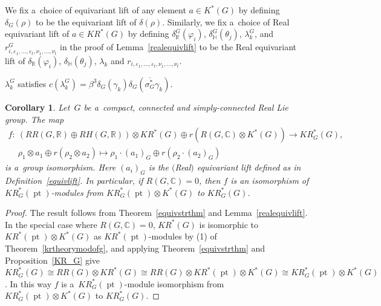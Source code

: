 \documentclass[pdftex]{sigma}
\numberwithin{equation}{section}
\newtheorem{Corollary}[Theorem]{Corollary}
\DeclareMathOperator{\pt}{pt}
\begin{document}
\begin{Definition}
\label{equivlift}
We f\/ix a~choice of equivariant lift of any element $a\in K^*(G)$ by def\/ining $\delta_G(\rho)$ to be the equivariant lift
of $\delta(\rho)$.
Similarly, we f\/ix a~choice of Real equivariant lift of $a\in KR^*(G)$ by def\/ining $\delta_\mathbb{R}^G(\varphi_i)$,
$\delta_\mathbb{H}^G(\theta_j)$, $\lambda_k^G$, and $r^G_{i, \varepsilon_1, \dots, \varepsilon_t, \nu_1, \dots, \nu_t}$
in the proof of Lemma~\ref{realequivlift} to be the Real equivariant lift of $\delta_\mathbb{R}(\varphi_i)$,
$\delta_\mathbb{H}(\theta_j)$, $\lambda_k$ and $r_{i, \varepsilon_1, \dots, \varepsilon_t, \nu_1, \dots, \nu_t}$.
\end{Definition}
\begin{Remark}
\label{cplxeqsquare}
$\lambda^G_k$ satisf\/ies $c(\lambda^G_k)=\beta^3\delta_G(\gamma_k)\delta_G(\overline{\sigma_G^*}
\gamma_k)$.
\end{Remark}
\begin{Corollary}
\label{equivstrthmg}
Let~$G$ be a~compact, connected and simply-connected Real Lie group.
The map
\begin{gather*}
f: \ (RR(G, \mathbb{R})\oplus RH(G, \mathbb{R}))\otimes KR^*(G)\oplus r(R(G, \mathbb{C})\otimes K^*(G))  \to  KR_G^*(G),
\\
\phantom{f: {}} \
\rho_1\otimes a_1\oplus r(\rho_2\otimes a_2)  \mapsto  \rho_1\cdot (a_1)_{G}\oplus r(\rho_2\cdot (a_2)_G)
\end{gather*}
is a~group isomorphism.
Here $(a_i)_G$ is the $($Real$)$ equivariant lift defined as in Definition~{\rm \ref{equivlift}}.
In particular, if $R(G, \mathbb{C})=0$, then $f$ is an isomorphism of $KR^*_{G}(\pt)$-modules from
$KR_G^*(\pt)\otimes K^*(G)$ to $KR_G^*(G)$.
\end{Corollary}
\begin{proof}
The result follows from Theorem~\ref{equivstrthm} and Lemma~\ref{realequivlift}.
In the special case where $R(G, \mathbb{C})=0$, $KR^*(G)$ is isomorphic to $KR^*(\pt)\otimes K^*(G)$ as
$KR^*(\pt)$-modules by (1) of Theorem~\ref{krtheorymodofg}, and applying Theorem~\ref{equivstrthm} and
Proposition~\ref{KR_G} give $KR^*_G(G)\cong RR(G)\otimes KR^*(G)\cong RR(G)\otimes KR^*(\pt)\otimes K^*(G)\cong
KR^*_G(\pt)\otimes K^*(G)$.
In this way $f$ is a~$KR_G^*(\pt)$-module isomorphism from $KR_G^*(\pt)\otimes K^*(G)$ to $KR_G^*(G)$.
\end{proof}
\end{document}
